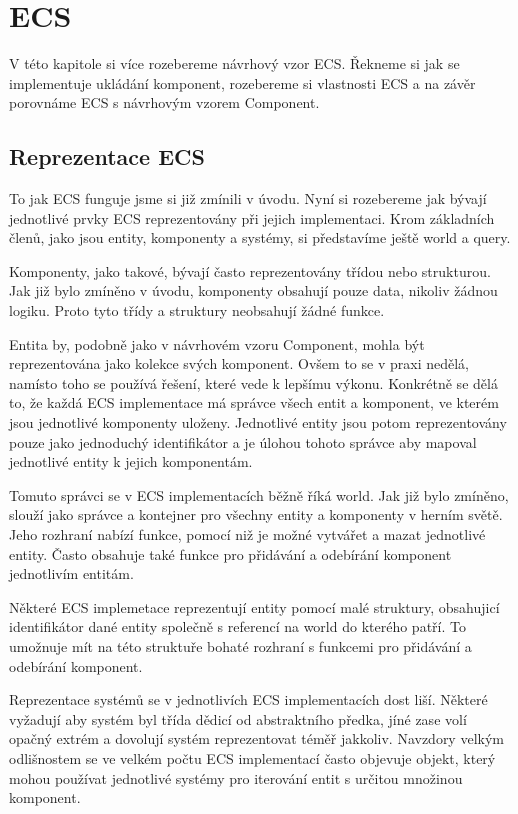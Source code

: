 \chapter{ECS}
\label{chap:ecs}
V této kapitole si více rozebereme návrhový vzor ECS. Řekneme si jak se implementuje ukládání komponent, rozebereme si vlastnosti ECS a na závěr porovnáme ECS s návrhovým vzorem Component.

\section{Reprezentace ECS}
To jak ECS funguje jsme si již zmínili v úvodu. Nyní si rozebereme jak bývají jednotlivé prvky ECS reprezentovány při jejich implementaci. Krom základních členů, jako jsou entity, komponenty a systémy, si představíme ještě world a query.

Komponenty, jako takové, bývají často reprezentovány třídou nebo strukturou. Jak již bylo zmíněno v úvodu, komponenty obsahují pouze data, nikoliv žádnou logiku. Proto tyto třídy a struktury neobsahují žádné funkce.

Entita by, podobně jako v návrhovém vzoru Component, mohla být reprezentována jako kolekce svých komponent. Ovšem to se v praxi nedělá, namísto toho se používá řešení, které vede k lepšímu výkonu. Konkrétně se dělá to, že každá ECS implementace má správce všech entit a komponent, ve kterém jsou jednotlivé komponenty uloženy. Jednotlivé entity jsou potom reprezentovány pouze jako jednoduchý identifikátor a je úlohou tohoto správce aby mapoval jednotlivé entity k jejich komponentám.

Tomuto správci se v ECS implementacích běžně říká world. Jak již bylo zmíněno, slouží jako správce a kontejner pro všechny entity a komponenty v herním světě. Jeho rozhraní nabízí funkce, pomocí niž je možné vytvářet a mazat jednotlivé entity. Často obsahuje také funkce pro přidávání a odebírání komponent jednotlivím entitám.

Některé ECS implemetace reprezentují entity pomocí malé struktury, obsahujicí identifikátor dané entity společně s referencí na world do kterého patří. To umožnuje mít na této struktuře bohaté rozhraní s funkcemi pro přidávání a odebírání komponent.

Reprezentace systémů se v jednotlivích ECS implementacích dost liší. Některé vyžadují aby systém byl třída dědicí od abstraktního předka, jíné zase volí opačný extrém a dovolují systém reprezentovat téměř jakkoliv. Navzdory velkým odlišnostem se ve velkém počtu ECS implementací často objevuje objekt, který mohou používat jednotlivé systémy pro iterování entit s určitou množinou komponent.

